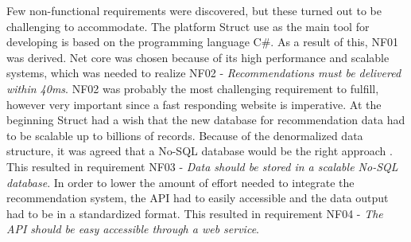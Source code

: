 Few non-functional requirements were discovered, but these turned out to be challenging to accommodate. The platform Struct use as the main tool for developing is based on the programming language C\#. As a result of this, NF01 was derived. Net core was chosen because of its high performance and scalable systems, which was needed to realize NF02 - \textit{Recommendations must be delivered within 40ms}.\cite{NetCore}
NF02 was probably the most challenging requirement to fulfill, however very important since a fast responding website is imperative. At the beginning Struct had a wish that the new database for recommendation data had to be scalable up to billions of records. Because of the denormalized data structure, it was agreed that a No-SQL database would be the right approach \cite{NoSQLScalability}. This resulted in requirement NF03 - \textit{Data should be stored in a scalable No-SQL database}. In order to lower the amount of effort needed to integrate the recommendation system, the API had to easily accessible and the data output had to be in a standardized format. This resulted in requirement NF04 - \textit{The API should be easy accessible through a web service}.
